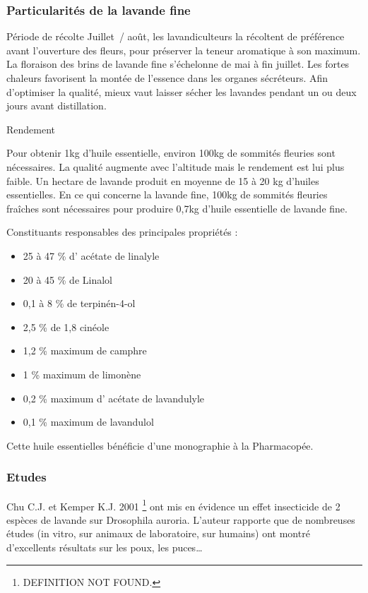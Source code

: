 \documentclass[12pt,a4wide]{article}
\begin{document}
\subsubsection{Particularités de la lavande fine}
\label{sec-4-8-3}

 Période de récolte
Juillet / août, les lavandiculteurs la récoltent de préférence avant l'ouverture des fleurs, pour préserver la teneur aromatique à son maximum. La floraison des brins de lavande fine s'échelonne de mai à fin juillet. Les fortes chaleurs favorisent la montée de l'essence dans les organes sécréteurs. Afin d'optimiser la qualité, mieux vaut laisser sécher les lavandes pendant un ou deux jours avant distillation.

Rendement

Pour obtenir 1kg d'huile essentielle, environ 100kg de sommités fleuries sont nécessaires. La qualité augmente avec l'altitude mais le rendement est lui plus faible. Un hectare de lavande produit en moyenne de 15 à 20 kg d'huiles essentielles. En ce qui concerne la lavande fine, 100kg de sommités fleuries fraîches sont nécessaires pour produire 0,7kg d'huile essentielle de lavande fine.

Constituants responsables des principales propriétés :

\begin{itemize}
\item 25 à 47 \% d' acétate de linalyle
\item 20 à 45 \% de Linalol
\item 0,1 à 8 \% de terpinén-4-ol
\item 2,5 \% de 1,8 cinéole
\item 1,2 \% maximum de camphre
\item 1 \% maximum de limonène
\item 0,2 \% maximum d' acétate de lavandulyle
\item 0,1 \% maximum de lavandulol
\end{itemize}

Cette huile essentielles bénéficie d'une monographie à la  Pharmacopée.

\subsubsection{Etudes}
\label{sec-4-8-4}

Chu C.J. et Kemper K.J. 2001 \footnote{DEFINITION NOT FOUND.} ont mis en évidence un effet insecticide de 2 espèces de lavande sur Drosophila auroria. L'auteur rapporte que de nombreuses études (in vitro, sur animaux de laboratoire, sur humains) ont montré d'excellents résultats sur les poux, les puces…
\end{document}
